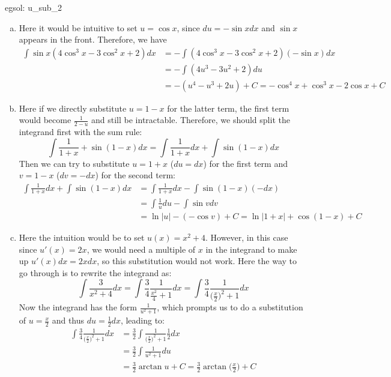 \begin{egsol}[]{egsol: u_sub_2}
    \begin{enumerate}[a)]
        \item Here it would be intuitive to set $u = \cos x$, since $du = -\sin x dx$ and $\sin x$ appears in the front.  Therefore, we have
        \begin{align*}
            \int \sin x(4\cos^3 x - 3\cos^2 x + 2) dx &= -\int (4\cos^3 x - 3\cos^2x + 2) (-\sin x)dx\\
            &= -\int (4u^3-3u^2+2) du\\
            &= -(u^4-u^3+2u) + C = -\cos^4x + \cos^3x - 2\cos x + C
        \end{align*}
        \item Here if we directly substitute $u = 1-x$ for the latter term, the first term would become $\frac{1}{2-u}$ and still be intractable.  Therefore, we should split the integrand first with the sum rule:
        \[\int \frac{1}{1+x} + \sin(1-x) dx = \int \frac{1}{1+x} dx + \int \sin(1-x) dx\]
        Then we can try to substitute $u = 1+x$ ($du = dx$) for the first term and $v = 1-x$ ($dv = -dx$) for the second term:
        \begin{align*}
            \int \frac{1}{1+x} dx + \int \sin(1-x) dx &= \int \frac{1}{1+x} dx - \int \sin(1-x) (-dx)\\
            &= \int \frac{1}{u} du - \int \sin v dv\\
            &= \ln |u| - (-\cos v) + C = \ln |1+x| + \cos(1-x) + C
        \end{align*}
        \item Here the intuition would be to set $u(x) = x^2 + 4$.  However, in this case since $u'(x) = 2x$, we would need a multiple of $x$ in the integrand to make up $u'(x)dx = 2xdx$, so this substitution would not work.  Here the way to go through is to rewrite the integrand as:
        \[\int \frac{3}{x^2+4} dx = \int \frac{3}{4}\frac{1}{\frac{x^2}{4} + 1} dx = \int \frac{3}{4}\frac{1}{\big(\frac{x}{2}\big)^2 + 1} dx\]
        Now the integrand has the form $\frac{1}{u^2+1}$, which prompts us to do a substitution of $u=\frac{x}{2}$ and thus $du = \frac{1}{2}dx$, leading to:
        \begin{align*}
            \int \frac{3}{4}\frac{1}{\big(\frac{x}{2}\big)^2 + 1} dx &= \frac{3}{2} \int \frac{1}{\big(\frac{x}{2}\big)^2 + 1} \frac{1}{2}dx\\
            &= \frac{3}{2}\int \frac{1}{u^2+1} du\\
            &= \frac{3}{2} \arctan u + C = \frac{3}{2} \arctan\big(\frac{x}{2}\big) + C

\end{align*}
\end{enumerate}
\end{egsol}

